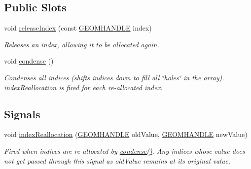 \subsection*{Public Slots}
\begin{DoxyCompactItemize}
\item 
void \hyperlink{class_index_pool_a7791b409b32242230867480c9b79de15}{release\-Index} (const \hyperlink{vertex_8h_a72202e57358ed73cd212e9a2eaf39aeb}{G\-E\-O\-M\-H\-A\-N\-D\-L\-E} index)
\begin{DoxyCompactList}\small\item\em Releases an index, allowing it to be allocated again. \end{DoxyCompactList}\item 
\hypertarget{class_index_pool_abda4a4fa05598f52c3af955788904c9f}{void \hyperlink{class_index_pool_abda4a4fa05598f52c3af955788904c9f}{condense} ()}\label{class_index_pool_abda4a4fa05598f52c3af955788904c9f}

\begin{DoxyCompactList}\small\item\em Condenses all indices (shifts indices down to fill all \char`\"{}holes\char`\"{} in the array). index\-Reallocation is fired for each re-\/allocated index. \end{DoxyCompactList}\end{DoxyCompactItemize}
\subsection*{Signals}
\begin{DoxyCompactItemize}
\item 
void \hyperlink{class_index_pool_a80b1499f90029a3531fc0603a5420cd8}{index\-Reallocation} (\hyperlink{vertex_8h_a72202e57358ed73cd212e9a2eaf39aeb}{G\-E\-O\-M\-H\-A\-N\-D\-L\-E} old\-Value, \hyperlink{vertex_8h_a72202e57358ed73cd212e9a2eaf39aeb}{G\-E\-O\-M\-H\-A\-N\-D\-L\-E} new\-Value)
\begin{DoxyCompactList}\small\item\em Fired when indices are re-\/allocated by \hyperlink{class_index_pool_abda4a4fa05598f52c3af955788904c9f}{condense()}. Any indices whose value does not get passed through this signal as old\-Value remains at its original value. \end{DoxyCompactList}\end{DoxyCompactItemize}
